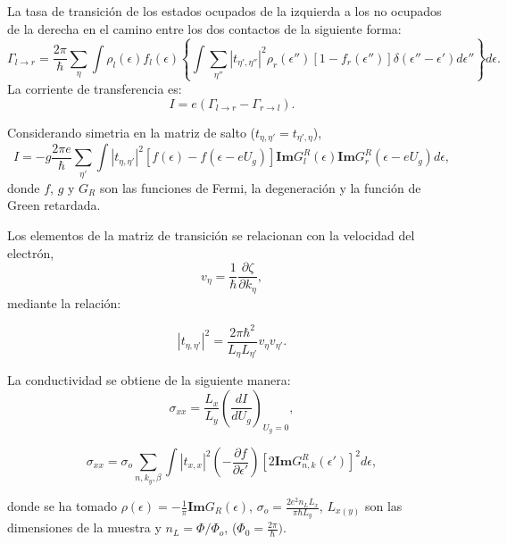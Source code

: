\begin{frame}
  La tasa de transición de los estados ocupados de la izquierda a los no ocupados de la derecha
  en el camino entre los dos contactos de la siguiente forma:
  \scriptsize
  \begin{equation}
    \Gamma_{l\rightarrow r}=\frac{2\pi}{\hbar}\sum_{\eta}\int \rho_{l}(\epsilon)f_{l}(\epsilon)\left\lbrace \int\sum_{\eta''}|t_{\eta',\eta''}|^{2}\rho_{r}(\epsilon'')[1-f_{r}(\epsilon'')]\delta(\epsilon''-\epsilon')d\epsilon''\right\rbrace d\epsilon.
  \end{equation}
  \small
  La corriente de transferencia es:
  \begin{equation}
    I=e(\Gamma_{l\rightarrow r}-\Gamma_{r\rightarrow l}).
  \end{equation}
\end{frame}

\begin{frame}
  Considerando simetria en la matriz de salto ($t_{\eta,\eta'} = t_{\eta',\eta}$),
  \begin{equation}
    I=-g\frac{2\pi e}{\hbar}\sum_{\eta'}\int |t_{\eta,\eta'}|^{2}[f(\epsilon)-f(\epsilon-eU_{g})]\textbf{Im}G_{l}^{R}(\epsilon)\mathbf{Im} G_{r}^{R}(\epsilon-eU_{g})d\epsilon,
  \end{equation}
  donde $f$, $g$ y $G_R$ son las funciones de Fermi, la degeneración y la función de Green retardada.
\end{frame}

\begin{frame}
  Los elementos de la matriz de transición se relacionan con la velocidad del electrón,
  $$v_{\eta} = \frac{1}{\hbar}\frac{\partial\zeta}{\partial k_{\eta}},$$
  mediante la relación:

  \begin{equation}
    | t_ {\eta, \eta'} |^ {2} = \frac{2 \pi \hbar^{2} }{L_{\eta} L_{\eta'}}v_{\eta} v_{\eta'}.
  \end{equation}
\end{frame}

\begin{frame}
  La conductividad se obtiene de la siguiente manera:
  \begin{equation}
    \sigma_{xx} = \frac{L_x}{L_y}\left(\frac{dI}{dU_g}\right)_{U_g=0},
  \end{equation}

  \begin{equation}
    \sigma_{xx}=\sigma_{o}\sum_{n,k_{y},\beta}\int |t_{x,x}|^{2}\left(-\frac{\partial f}{\partial\epsilon'}\right)\left[2\textbf{Im}G_{n,k}^{R}(\epsilon')\right]^{2}d\epsilon,
    \label{eq:conductividad}
  \end{equation}

  donde se ha tomado $\rho(\epsilon) = - \frac{1}{\pi}\textbf{Im} G_{R} (\epsilon)$,
  $\sigma_{o} = \frac{2 e^{2} n_{L} L_{x}}{\pi \hbar L_{y}}$,
  $ L_{x (y)} $ son las dimensiones de la muestra y $ n_{L} = \Phi / \Phi_{o} $, ($\Phi_{0} = \frac{2\pi}{\hbar})$.
\end{frame}

